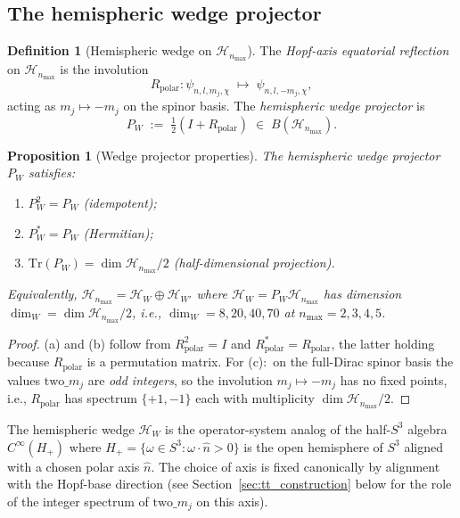 \documentclass[11pt,a4paper]{article}
\theoremstyle{plain}
\newtheorem{proposition}[theorem]{Proposition}
\theoremstyle{definition}
\newtheorem{definition}[theorem]{Definition}
\newcommand{\nmax}{n_{\max}}
\newcommand{\sthree}{S^{3}}
\newcommand{\Hilb}{\mathcal{H}}
\newcommand{\Tr}{\mathrm{Tr}}
\begin{document}
\subsection{The hemispheric wedge projector}\label{sec:hemispheric_wedge}

\begin{definition}[Hemispheric wedge on $\Hilb_{\nmax}$]
\label{def:wedge}
The \emph{Hopf-axis equatorial reflection} on $\Hilb_{\nmax}$ is the
involution
\begin{equation}\label{eq:R_polar_def}
   R_{\mathrm{polar}}: \psi_{n, l, m_j, \chi}
   \;\longmapsto\; \psi_{n, l, -m_j, \chi},
\end{equation}
acting as $m_j \mapsto -m_j$ on the spinor basis. The
\emph{hemispheric wedge projector} is
\begin{equation}\label{eq:P_W_def}
   P_W \;:=\; \tfrac{1}{2}(I + R_{\mathrm{polar}})
   \;\in\; B(\Hilb_{\nmax}).
\end{equation}
\end{definition}

\begin{proposition}[Wedge projector properties]\label{prop:wedge_properties}
The hemispheric wedge projector $P_W$ satisfies:
\begin{enumerate}\setlength{\itemsep}{2pt}
\item[(a)] $P_W^2 = P_W$ (idempotent);
\item[(b)] $P_W^* = P_W$ (Hermitian);
\item[(c)] $\Tr(P_W) = \dim \Hilb_{\nmax} / 2$ (half-dimensional
projection).
\end{enumerate}
Equivalently, $\Hilb_{\nmax} = \Hilb_W \oplus \Hilb_{W'}$ where
$\Hilb_W = P_W \Hilb_{\nmax}$ has dimension $\dim_W = \dim \Hilb_{\nmax}/2$,
i.e., $\dim_W = 8, 20, 40, 70$ at $\nmax = 2, 3, 4, 5$.
\end{proposition}

\begin{proof}
(a) and (b) follow from $R_{\mathrm{polar}}^2 = I$ and
$R_{\mathrm{polar}}^* = R_{\mathrm{polar}}$, the latter holding because
$R_{\mathrm{polar}}$ is a permutation matrix. For (c):\ on the
full-Dirac spinor basis the values $\mathrm{two}\_m_j$ are
\emph{odd integers}, so the involution $m_j \mapsto -m_j$ has no fixed
points, i.e., $R_{\mathrm{polar}}$ has spectrum $\{+1, -1\}$ each with
multiplicity $\dim \Hilb_{\nmax}/2$.
\end{proof}

The hemispheric wedge $\Hilb_W$ is the operator-system analog of the
half-$\sthree$ algebra $C^\infty(H_+)$ where $H_+ = \{\omega \in
\sthree : \omega \cdot \hat{n} > 0\}$ is the open hemisphere of
$\sthree$ aligned with a chosen polar axis $\hat{n}$. The choice of
axis is fixed canonically by alignment with the Hopf-base direction
(see Section~\ref{sec:tt_construction} below for the role of the integer
spectrum of $\mathrm{two}\_m_j$ on this axis).
\end{document}
